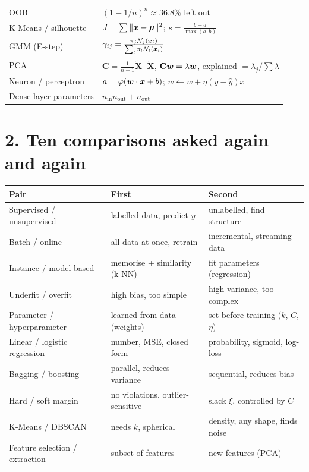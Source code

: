 \begin{center}
\begin{tabular}{@{}p{4.0cm}p{12.6cm}@{}}
OOB & $(1-1/n)^n\approx36.8\%$ left out\\
K-Means / silhouette & $J=\sum\|\boldsymbol{x}-\boldsymbol{\mu}\|^2$; $s=\frac{b-a}{\max(a,b)}$\\
GMM (E-step) & $\gamma_{ij}=\frac{\pi_j\mathcal N_j(\boldsymbol{x}_i)}{\sum_l\pi_l\mathcal N_l(\boldsymbol{x}_i)}$\\
PCA & $\mathbf C=\frac1{n-1}\tilde{\mathbf X}^{\!\top}\tilde{\mathbf X}$, $\mathbf C\boldsymbol{w}=\lambda\boldsymbol{w}$, explained $=\lambda_j/\sum\lambda$\\
Neuron / perceptron & $a=\varphi(\boldsymbol{w}\cdot\boldsymbol{x}+b)$; $w\leftarrow w+\eta(y-\hat y)x$\\
Dense layer parameters & $n_{\text{in}}n_{\text{out}}+n_{\text{out}}$\\
\bottomrule
\end{tabular}
\end{center}

\section*{2. Ten comparisons asked again and again}
\begin{center}
\small
\begin{tabular}{@{}p{4.2cm}p{5.8cm}p{5.8cm}@{}}
\toprule
\textbf{Pair} & \textbf{First} & \textbf{Second}\\
\midrule
Supervised / unsupervised & labelled data, predict $y$ & unlabelled, find structure\\
Batch / online & all data at once, retrain & incremental, streaming data\\
Instance / model-based & memorise + similarity (k-NN) & fit parameters (regression)\\
Underfit / overfit & high bias, too simple & high variance, too complex\\
Parameter / hyperparameter & learned from data (weights) & set before training ($k$, $C$, $\eta$)\\
Linear / logistic regression & number, MSE, closed form & probability, sigmoid, log-loss\\
Bagging / boosting & parallel, reduces variance & sequential, reduces bias\\
Hard / soft margin & no violations, outlier-sensitive & slack $\xi$, controlled by $C$\\
K-Means / DBSCAN & needs $k$, spherical & density, any shape, finds noise\\
Feature selection / extraction & subset of features & new features (PCA)\\
\bottomrule
\end{tabular}
\end{center}

